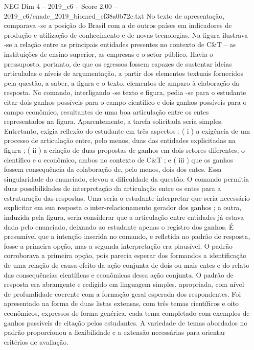 \begin{textsample}{NEG Dim 4 – 2019\_c6 – Score 2.00 – 2019\_c6/enade\_2019\_biomed\_ef38a0b72c.txt}
No texto de apresentação, comparava -se a posição do Brasil com a de outros países em indicadores de produção e utilização de conhecimento e de novas tecnologias.
Na figura ilustrava -se a relação entre as principais entidades presentes no contexto de C\&T – as instituições de ensino superior, as empresas e o setor público.
Havia o pressuposto, portanto, de que os egressos fossem capazes de sustentar ideias articuladas e níveis de argumentação, a partir dos elementos textuais fornecidos pela questão, a saber, a figura e o texto, elementos de amparo à elaboração da resposta.
No comando, interligando -se texto e figura, pedia -se para o estudante citar dois ganhos possíveis para o campo científico e dois ganhos possíveis para o campo econômico, resultantes de uma boa articulação entre os entes representados na figura.
Aparentemente, a tarefa solicitada seria simples.
Entretanto, exigia reflexão do estudante em três aspectos : ( i ) a exigência de um processo de articulação entre, pelo menos, duas das entidades explicitadas na figura ; ( ii ) a criação de duas propostas de ganhos em dois setores diferentes, o científico e o econômico, ambos no contexto de C\&T ; e ( iii ) que os ganhos fossem consequência da colaboração de, pelo menos, dois dos entes.
Essa singularidade do enunciado, elevou a dificuldade da questão.
O comando permitia duas possibilidades de interpretação da articulação entre os entes para a estruturação das respostas.
Uma seria o estudante interpretar que seria necessário explicitar em sua resposta o inter-relacionamento gerador dos ganhos ; a outra, induzida pela figura, seria considerar que a articulação entre entidades já estava dada pelo enunciado, deixando ao estudante apenas o registro dos ganhos.
É presumível que a intenção inserida no comando, e refletida no padrão de resposta, fosse a primeira opção, mas a segunda interpretação era plausível.
O padrão corroborava a primeira opção, pois parecia esperar dos formandos a identificação de uma relação de causa-efeito da ação conjunta de dois ou mais entes e do relato das consequências científicas e econômicas dessa ação conjunta.
O padrão de resposta era abrangente e redigido em linguagem simples, apropriada, com nível de profundidade coerente com a formação geral esperada dos respondentes.
Foi apresentado na forma de duas listas extensas, com três temas científicos e oito econômicos, expressos de forma genérica, cada tema completado com exemplos de ganhos passíveis de citação pelos estudantes.
A variedade de temas abordados no padrão proporcionou a flexibilidade e a extensão necessárias para orientar critérios de avaliação.

\end{textsample}
